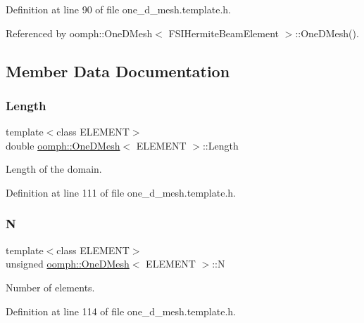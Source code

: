 Definition at line 90 of file one\+\_\+d\+\_\+mesh.\+template.\+h.



Referenced by oomph\+::\+One\+D\+Mesh$<$ F\+S\+I\+Hermite\+Beam\+Element $>$\+::\+One\+D\+Mesh().



\subsection{Member Data Documentation}
\mbox{\label{classoomph_1_1OneDMesh_a9c5ebabd7b2286b5f489563b1106e1b4}} 
\subsubsection{\texorpdfstring{Length}{Length}}
{\footnotesize\ttfamily template$<$class E\+L\+E\+M\+E\+NT$>$ \\
double \hyperlink{classoomph_1_1OneDMesh}{oomph\+::\+One\+D\+Mesh}$<$ E\+L\+E\+M\+E\+NT $>$\+::Length\hspace{0.3cm}{\ttfamily [protected]}}



Length of the domain. 



Definition at line 111 of file one\+\_\+d\+\_\+mesh.\+template.\+h.

\mbox{\label{classoomph_1_1OneDMesh_a6f6f4087d7dd7417c79f39f2c3a2865a}} 
\subsubsection{\texorpdfstring{N}{N}}
{\footnotesize\ttfamily template$<$class E\+L\+E\+M\+E\+NT$>$ \\
unsigned \hyperlink{classoomph_1_1OneDMesh}{oomph\+::\+One\+D\+Mesh}$<$ E\+L\+E\+M\+E\+NT $>$\+::N\hspace{0.3cm}{\ttfamily [protected]}}



Number of elements. 



Definition at line 114 of file one\+\_\+d\+\_\+mesh.\+template.\+h.

